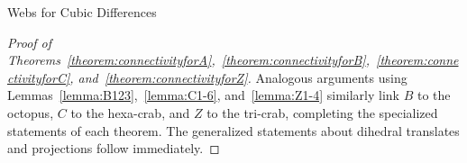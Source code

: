 \begin{subsection}{Webs for Cubic Differences}
\begin{proof}[Proof of Theorems~\ref{theorem:connectivityforA},~\ref{theorem:connectivityforB},~\ref{theorem:connectivityforC}, and~\ref{theorem:connectivityforZ}]
Analogous arguments using Lemmas~\ref{lemma:B123},~\ref{lemma:C1-6}, and~\ref{lemma:Z1-4} similarly link $B$ to the octopus, $C$ to the hexa-crab, and $Z$ to the tri-crab, completing the specialized statements of each theorem. The generalized statements about dihedral translates and projections follow immediately.
\end{proof}
\end{subsection}
